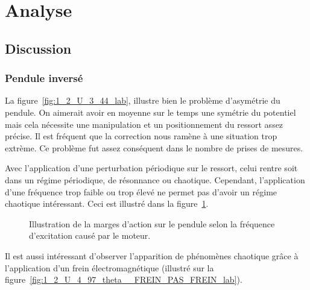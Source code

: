 \documentclass[a4paper,12pt,oneside]{article}
\begin{document}









\section{Analyse}%

\subsection{Discussion}

\subsubsection{Pendule inversé}
La figure~\ref{fig:1_2_U_3_44_lab}, illustre bien le problème d'asymétrie du pendule. On aimerait avoir en moyenne sur le temps une symétrie du potentiel mais cela nécessite une manipulation et un positionnement du ressort assez précise. Il est fréquent que la correction nous ramène à une situation trop extrème. Ce problème fut assez conséquent dans le nombre de prises de mesures.

Avec l'application d'une perturbation périodique sur le ressort, celui rentre soit dans un régime périodique, de résonnance ou chaotique. Cependant, l'application d'une fréquence trop faible ou trop élevé ne permet pas d'avoir un régime chaotique intéressant. Ceci est illustré dans la figure~\ref{fig:vitesse}.

\begin{figure}[!ht]
    \hfill
    \caption{Illustration de la marges d'action sur le pendule selon la fréquence d'excitation causé par le moteur.}
    \label{fig:vitesse}
\end{figure}




Il est aussi intéressant d'observer l'apparition de phénomènes chaotique grâce à l'application d'un frein électromagnétique (illustré sur la figure~\ref{fig:1_2_U_4_97_theta__FREIN_PAS_FREIN_lab}). %
\end{document}

